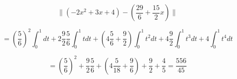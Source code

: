 \documentclass[12pt,a4paper]{article}
\providecommand{\norm}[1]{\lVert#1\rVert}
\begin{document}
\begin{enumerate}
    \begin{equation*}
        \norm{(-2x^2 +3x+4) - (\frac{29}{6} + \frac{15}{2} x)} 
    \end{equation*}
    
    \begin{equation*}
        = \left(\frac{5}{6}\right)^2\int_{0}^{1} dt + 2\frac{9}{2}\frac{5}{6} \int_{0}^{1} t dt + (4 \frac{5}{6} + \frac{9}{2}) \int_{0}^{1} t^2 dt + 4 \frac{9}{2} \int_{0}^{1} t^3 dt + 4 \int_{0}^{1} t^4 dt  
    \end{equation*}
    
    \begin{equation*}
        = \left(\frac{5}{6}\right)^2 + \frac{9}{2}\frac{5}{6} + (4 \frac{5}{18} + \frac{9}{6}) + \frac{9}{2} + \frac{4}{5} = \frac{556}{45}
    \end{equation*}
    
    
    
    
\end{enumerate}
\end{document}
